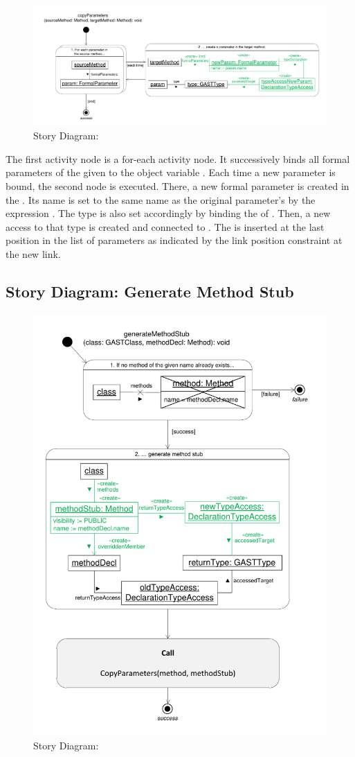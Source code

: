 \begin{figure}[hbtp]
\centering
\includegraphics[width=0.9\linewidth]{./figures/SDCopyParameters}
\caption{Story Diagram: }
\label{fig:SDCopyParameters}
\end{figure}

The first activity node is a for-each activity node. It successively binds all formal parameters of the given  to the object variable . Each time a new parameter is bound, the second node is executed. There, a new formal parameter  is created in the . Its name is set to the same name as the original parameter's by the expression . The type is also set accordingly by binding the  of . Then, a new access to that type is created and connected to . The  is inserted at the last position in the list of parameters as indicated by the link position constraint  at the new  link.


\subsection{Story Diagram: Generate Method Stub}

\begin{figure}[hbtp]
\centering
\includegraphics[width=0.7\linewidth]{./figures/SDGenerateMethodStub}
\caption{Story Diagram: }
\label{fig:SDGenerateMethodStub}
\end{figure}

